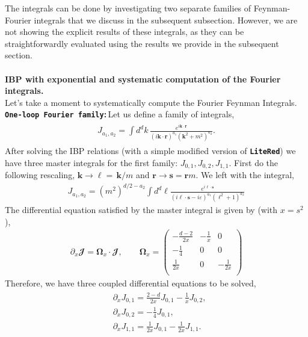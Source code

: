 The integrals can be done by investigating two separate families of Feynman-Fourier integrals that we discuss in the subsequent subsection. However, we are not showing the explicit results of these integrals, as they can be straightforwardly evaluated using the results we provide in the subsequent section.\\\\
\textbf{IBP with exponential and systematic computation of the Fourier integrals.}\\ 
Let's take a moment to systematically compute the Fourier Feynman Integrals.\\
\textbf{\texttt{One-loop Fourier family}:}\,Let us define a family of integrals,
\begin{align}
    \begin{split}
        {J}_{a_1,a_2}= \int d^dk\, \frac{e^{i\boldsymbol{k}\cdot \boldsymbol r}}{(i \boldsymbol{k}\cdot \boldsymbol r)^{a_1}(\boldsymbol{k}^2+m^2)^{a_2}}.
    \end{split}
\end{align}
After solving the IBP relations (with a simple modified version of \textbf{\texttt{LiteRed}}\cite{Lee:2013mka}) we have three master integrals for the first family: ${J}^{}_{0,1},{J}^{}_{0,2}, {J}^{}_{1,1}$. First do the following rescaling, $\boldsymbol{k}\to \boldsymbol{\ell}=\,\boldsymbol{k}/m$ and $\boldsymbol{r}\to \boldsymbol{s}=\boldsymbol{r}m$. We left with the integral,
\begin{align}
    J_{a_1,a_2}=(m^2)^{d/2-a_2}\int d^d\boldsymbol{\ell} \frac{e^{i\boldsymbol{\ell}\cdot\boldsymbol{s}}}{(i\boldsymbol{\ell}\cdot \boldsymbol{s}-i\varepsilon)^{a_1}(\boldsymbol{\ell}^2+1)^{a_2}}
\end{align}
The differential equation satisfied by the master integral is given by (with $x=s^2$),
\begin{align}
    \partial_{x}\boldsymbol{\mathbfcal{J}}=\boldsymbol{\Omega}_{x}\cdot \boldsymbol{\mathbfcal{J}},\qquad   \boldsymbol{\Omega}_{x}=\left(
\begin{array}{ccc}
 -\frac{d-2}{2 x} & -\frac{1}{x} & 0 \\
 -\frac{1}{4} & 0 & 0 \\
 \frac{1}{2 x} & 0 & -\frac{1}{2 x} \\
\end{array}
\right)
\end{align}
Therefore, we have three coupled differential equations to be solved,
\begin{align}
    \begin{split}&\partial_{x}J_{0,1}=\frac{2-d}{2x}J_{0,1}-\frac{1}{x}J_{0,2},\\&
    \partial_{x}J_{0,2}=-\frac{1}{4}J_{0,1},\\ &
    \partial_{x}J_{1,1}=\frac{1}{2x}J_{0,1}-\frac{1}{2x}J_{1,1}.
    \end{split}
\end{align}

